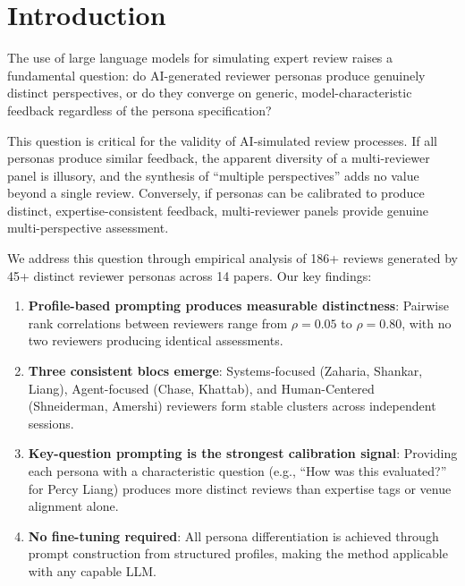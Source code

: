 \section{Introduction}

The use of large language models for simulating expert review raises a fundamental question: do AI-generated reviewer personas produce genuinely distinct perspectives, or do they converge on generic, model-characteristic feedback regardless of the persona specification?

This question is critical for the validity of AI-simulated review processes. If all personas produce similar feedback, the apparent diversity of a multi-reviewer panel is illusory, and the synthesis of ``multiple perspectives'' adds no value beyond a single review. Conversely, if personas can be calibrated to produce distinct, expertise-consistent feedback, multi-reviewer panels provide genuine multi-perspective assessment.

We address this question through empirical analysis of 186+ reviews generated by 45+ distinct reviewer personas across 14 papers. Our key findings:

\begin{enumerate}
    \item \textbf{Profile-based prompting produces measurable distinctness}: Pairwise rank correlations between reviewers range from $\rho = 0.05$ to $\rho = 0.80$, with no two reviewers producing identical assessments.
    \item \textbf{Three consistent blocs emerge}: Systems-focused (Zaharia, Shankar, Liang), Agent-focused (Chase, Khattab), and Human-Centered (Shneiderman, Amershi) reviewers form stable clusters across independent sessions.
    \item \textbf{Key-question prompting is the strongest calibration signal}: Providing each persona with a characteristic question (e.g., ``How was this evaluated?'' for Percy Liang) produces more distinct reviews than expertise tags or venue alignment alone.
    \item \textbf{No fine-tuning required}: All persona differentiation is achieved through prompt construction from structured profiles, making the method applicable with any capable LLM.
\end{enumerate}
